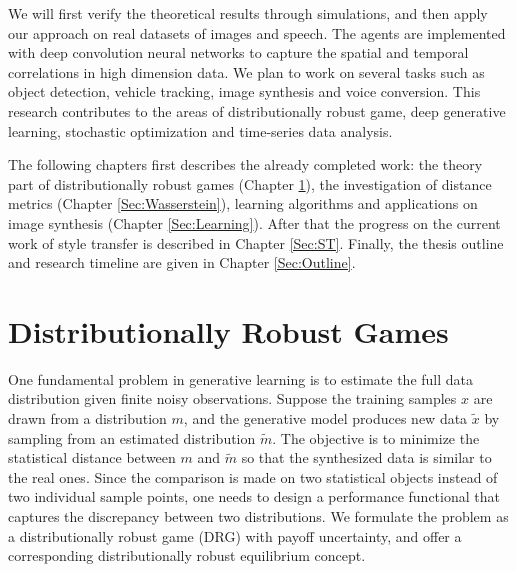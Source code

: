 \documentclass{article}
\begin{document}
We will first verify the theoretical results through simulations, and then apply our approach on real datasets of images and speech. The agents are implemented with deep convolution neural networks to capture the spatial and temporal correlations in high dimension data. We plan to work on several tasks such as object detection, vehicle tracking, image synthesis and voice conversion. This research contributes to the areas of distributionally robust game, deep generative learning, stochastic optimization and time-series data analysis.

The following chapters first describes the already completed work: the theory part of distributionally robust games (Chapter \ref{Sec:DRG}), the investigation of distance metrics (Chapter \ref{Sec:Wasserstein}), learning algorithms and applications on image synthesis (Chapter \ref{Sec:Learning}). After that the progress on the current work of style transfer is described in Chapter \ref{Sec:ST}. Finally, the thesis outline and research timeline are given in Chapter \ref{Sec:Outline}.

\newpage



\section{Distributionally Robust Games}
\label{Sec:DRG}
One fundamental problem in generative learning is to estimate the full data distribution given finite noisy observations. Suppose the training samples $x$ are drawn from a distribution $m$, and the generative model produces new data $\tilde{x}$ by sampling from an estimated distribution $\tilde{m}$. The objective is to minimize the statistical distance between $m$ and $\tilde{m}$ so that the synthesized data is similar to the real ones. Since the comparison is made on two statistical objects instead of two individual sample points, one needs to design a performance functional that captures the discrepancy between two distributions. We formulate the problem as a distributionally robust game (DRG) with payoff uncertainty, and offer a corresponding distributionally robust equilibrium concept.
\end{document}
